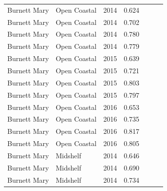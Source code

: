 \begin{longtable}{llccccc}
  Burnett Mary & Open Coastal & 2014 & 0.624 & \cellcolor[HTML]{F0C918}{C} & \cellcolor[HTML]{B0D235}{B} & \cellcolor[HTML]{F0C918}{C} \\ 
  Burnett Mary & Open Coastal & 2014 & 0.702 & \cellcolor[HTML]{B0D235}{B} & \cellcolor[HTML]{B0D235}{B} & \cellcolor[HTML]{B0D235}{B} \\ 
  Burnett Mary & Open Coastal & 2014 & 0.780 & \cellcolor[HTML]{B0D235}{B} & \cellcolor[HTML]{B0D235}{B} & \cellcolor[HTML]{B0D235}{B} \\ 
  Burnett Mary & Open Coastal & 2014 & 0.779 & \cellcolor[HTML]{B0D235}{B} & \cellcolor[HTML]{B0D235}{B} & \cellcolor[HTML]{B0D235}{B} \\ 
  Burnett Mary & Open Coastal & 2015 & 0.639 & \cellcolor[HTML]{F0C918}{C} & \cellcolor[HTML]{B0D235}{B} & \cellcolor[HTML]{F0C918}{C} \\ 
  Burnett Mary & Open Coastal & 2015 & 0.721 & \cellcolor[HTML]{B0D235}{B} & \cellcolor[HTML]{B0D235}{B} & \cellcolor[HTML]{B0D235}{B} \\ 
  Burnett Mary & Open Coastal & 2015 & 0.803 & \cellcolor[HTML]{B0D235}{B} & \cellcolor[HTML]{00734D}{A} & \cellcolor[HTML]{B0D235}{B} \\ 
  Burnett Mary & Open Coastal & 2015 & 0.797 & \cellcolor[HTML]{B0D235}{B} & \cellcolor[HTML]{B0D235}{B} & \cellcolor[HTML]{B0D235}{B} \\ 
  Burnett Mary & Open Coastal & 2016 & 0.653 & \cellcolor[HTML]{F0C918}{C} & \cellcolor[HTML]{B0D235}{B} & \cellcolor[HTML]{B0D235}{B} \\ 
  Burnett Mary & Open Coastal & 2016 & 0.735 & \cellcolor[HTML]{B0D235}{B} & \cellcolor[HTML]{B0D235}{B} & \cellcolor[HTML]{B0D235}{B} \\ 
  Burnett Mary & Open Coastal & 2016 & 0.817 & \cellcolor[HTML]{B0D235}{B} & \cellcolor[HTML]{00734D}{A} & \cellcolor[HTML]{B0D235}{B} \\ 
  Burnett Mary & Open Coastal & 2016 & 0.805 & \cellcolor[HTML]{B0D235}{B} & \cellcolor[HTML]{00734D}{A} & \cellcolor[HTML]{B0D235}{B} \\ 
  Burnett Mary & Midshelf & 2014 & 0.646 & \cellcolor[HTML]{F0C918}{C} & \cellcolor[HTML]{B0D235}{B} & \cellcolor[HTML]{F0C918}{C} \\ 
  Burnett Mary & Midshelf & 2014 & 0.690 & \cellcolor[HTML]{B0D235}{B} & \cellcolor[HTML]{B0D235}{B} & \cellcolor[HTML]{B0D235}{B} \\ 
  Burnett Mary & Midshelf & 2014 & 0.734 & \cellcolor[HTML]{B0D235}{B} & \cellcolor[HTML]{B0D235}{B} & \cellcolor[HTML]{B0D235}{B} \\ 

\end{longtable}
